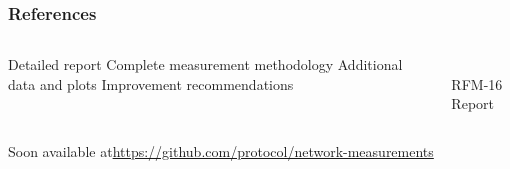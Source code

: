 \documentclass{pl-slide}
\begin{document}
\begin{frame}
\frametitle{References}
\begin{columns}[onlytextwidth]
\begin{column}{0.60\textwidth}
\begin{itemize}
	\itemc Detailed report
	\itemc Complete measurement methodology
	\itemc Additional data and plots
	\itemc Improvement recommendations
\end{itemize}
\end{column}
\begin{column}{0.38\textwidth}
\begin{center}
\\
\medskip
RFM-16 Report
\bigskip
\end{center}
\end{column}
\end{columns}

\begin{itemize}
	\itemc Soon available at\hspace{.6em}\url{https://github.com/protocol/network-measurements}

\end{itemize}

\end{frame}
\end{document}
